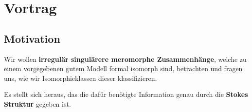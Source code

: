 \chapter{Vortrag}
\section{Motivation} %
Wir wollen \textbf{irregulär singulärere meromorphe Zusammenhänge}, welche zu
einem vorgegebenen gutem Modell formal isomorph sind, betrachten und fragen
uns, wie wir Isomorphieklassen dieser klassifizieren.

Es stellt sich heraus, das die dafür benötigte Information genau durch die
\textbf{Stokes Struktur} gegeben ist.

\begin{comment}
  Um diese zu erklären wir zunächst das Konzept einer \textbf{Asymptotischen
  Erweiterung} erläutert, danach sollen die Stokes Strukturen in einer
  \textbf{Matrix-} sowie einer \textbf{Garben-Variante} definiert werden.
  Zum Schluss werden noch die essentiellen Theoreme erwähnt.
\end{comment}
